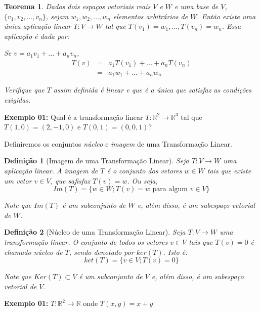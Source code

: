 \documentclass[oneside,a4paper,12pt]{article}
\newtheorem{theorem}{Teorema}[section]
\newtheorem{definition}{Definição}[section]
\begin{document}
\begin{theorem}
	Dados dois espaços vetoriais reais $V$ e $W$ e uma base de $V$, $\{ v_1, v_2, \dots, v_n \}$, sejam $w_1, w_2, \dots, w_n$ elementos arbitrários de $W$. Então existe uma única aplicação linear $T: V \rightarrow W$ tal que $T(v_1) = w_1, \dots, T(v_n) = w_n$. Essa aplicação é dada por:
	
	Se $v = a_1 v_1 + \dots + a_n v_n$,
	\begin{eqnarray*}
		T(v) & = & a_1 T(v_1) + \dots + a_n T(v_n) \\
			& = & a_1 w_1 + \dots + a_n w_n
	\end{eqnarray*}
	
	\emph{Verifique que $T$ assim definida é linear e que é a única que satisfaz as condições exigidas.}
\end{theorem}

{\bf Exemplo 01:} Qual é a transformação linear $T:\mathbb{R}^2 \rightarrow \mathbb{R}^3$ tal que $T(1,0) = (2,-1,0)$ e $T(0,1) = (0,0,1)$?

\vspace{150pt}

Definiremos os conjuntos \emph{núcleo} e \emph{imagem} de uma Transformação Linear.

\begin{definition}[Imagem de uma Transformação Linear]
	Seja $T:V \rightarrow W$ uma aplicação linear. A \emph{imagem} de $T$ é o conjunto dos vetores $w \in W$ tais que existe um vetor $v \in V$, que safisfaz $T(v) = w$. Ou seja,
	$$Im(T) = \{ w \in W; T(v) = w \text{ para algum } v \in V  \}$$
	
	Note que $Im(T)$ é um subconjunto de $W$ e, além disso, é um subespaço vetorial de $W$.
\end{definition}

\begin{definition}[Núcleo de uma Transformação Linear]
	Seja $T:V \rightarrow W$ uma transformação linear. O conjunto de todos os vetores $v \in V$ tais que $T(v) = 0$ é chamado \emph{núcleo} de $T$, sendo denotado por $ker(T)$. Isto é:
	$$ket(T) = \{ v \in V; T(v) = 0 \}$$
	
	Note que $Ker(T) \subset V$ é um subconjunto de $V$ e, além disso, é um subespaço vetorial de $V$.
	
	\vspace{150pt}
\end{definition}

{\bf Exemplo 01:} $T: \mathbb{R}^2 \rightarrow \mathbb{R}$ onde $T(x,y) = x + y$
\end{document}
